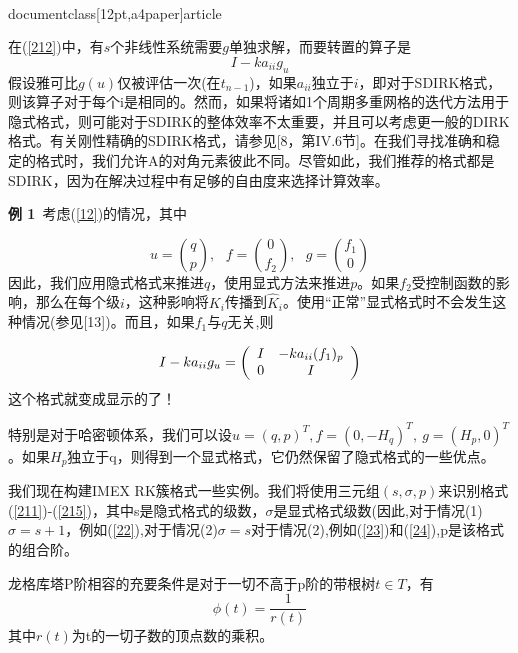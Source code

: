 \\documentclass[12pt,a4paper]{article}
\begin{document}
在(\ref{212})中，有$s$个非线性系统需要$g$单独求解，而要转置的算子是
\begin{equation}
I-ka_{ii}g_{u}
\end{equation}
假设雅可比$g(u)$仅被评估一次(在$t_{n-1}$)，如果$a_{ii}$独立于$i$，即对于SDIRK格式，则该算子对于每个i是相同的。然而，如果将诸如1个周期多重网格的迭代方法用于隐式格式，则可能对于SDIRK的整体效率不太重要，并且可以考虑更一般的DIRK格式。有关刚性精确的SDIRK格式，请参见[8，第IV.6节]。在我们寻找准确和稳定的格式时，我们允许A的对角元素彼此不同。尽管如此，我们推荐的格式都是SDIRK，因为在解决过程中有足够的自由度来选择计算效率。

\textbf{例 1}~考虑(\ref{12})的情况，其中

\begin{equation}
u=\binom{q}{p},~~~f=\binom{0}{f_{2}},~~~g=\binom{f_{1}}{0}
\end{equation}
因此，我们应用隐式格式来推进$q$，使用显式方法来推进$p$。如果$f_{2}$受控制函数的影响，那么在每个级$i$，这种影响将$K_{i}$传播到$\widehat{K}_{i}$。使用“正常”显式格式时不会发生这种情况(参见[13])。而且，如果$f_{1}$与$q$无关,则

\begin{equation}
I-ka_{ii}g_{u}=\left(
\begin{array}{c c}
I & -ka_{ii}(f_{1})_{p}\\
0 & I\\
\end{array}
\right)
\end{equation}
这个格式就变成显示的了！

特别是对于哈密顿体系，我们可以设$u=(q,p)^T,f=(0,-H_{q})^T,~g=(H_{p},0)^T$。如果$H_{p}$独立于q，则得到一个显式格式，它仍然保留了隐式格式的一些优点。


我们现在构建IMEX RK簇格式一些实例。我们将使用三元组$(s,\sigma,p)$来识别格式(\ref{211})-(\ref{215})，其中s是隐式格式的级数，$\sigma$是显式格式级数(因此,对于情况(1)$\sigma=s+1$，例如(\ref{22}),对于情况(2)$\sigma=s$对于情况(2),例如(\ref{23})和(\ref{24}),p是该格式的组合阶。


龙格库塔P阶相容的充要条件是对于一切不高于p阶的带根树$t\in T$，有
\begin{equation*}
\phi(t)=\frac{1}{r(t)}
\end{equation*}
其中$r(t)$为t的一切子数的顶点数的乘积。
\end{document}
